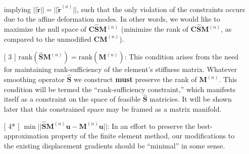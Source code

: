 \documentclass[12pt]{article}
\begin{document}
\begin{itemize}
\begin{equation}
        \end{equation}
        implying $||\tilde{\mathbf{r}}|| = ||\tilde{\mathbf{r}}^{(a)}||$, such that the only violation of the constraints occurs due to the affine deformation modes. In other words, we would like to maximize the null space of $\mathbf{C} \hat{\mathbf{S}} \mathbf{M}^{(n)}$ (minimize the rank of $\mathbf{C} \hat{\mathbf{S}} \mathbf{M}^{(n)}$, as compared to the unmodified $\mathbf{C} \mathbf{M}^{(n)}$).
        \item[[ 3]] $\mbox{rank}(\hat{\mathbf{S}} \mathbf{M}^{(n)}) = \mbox{rank}(\mathbf{M}^{(n)})$: This condition arises from the need for maintaining rank-sufficiency of the element's stiffness matrix. Whatever smoothing operator $\hat{\mathbf{S}}$ we construct \textbf{must} preserve the rank of $\mathbf{M}^{(n)}$. This condition will be termed the ``rank-sufficiency constraint,'' which manifests itself as a constraint on the space of feasible $\hat{\mathbf{S}}$ matricies. It will be shown later that this constrained space may be framed as a matrix manifold.
        \item[[ 4*]] $\min || \hat{\mathbf{S}} \mathbf{M}^{(n)} \mathbf{u} - \mathbf{M}^{(n)} \mathbf{u} ||$: In an effort to  preserve the best-approximation property of the finite element method, our modifications to the existing displacement gradients should be ``minimal'' in some sense.
\end{itemize}
\end{document}

